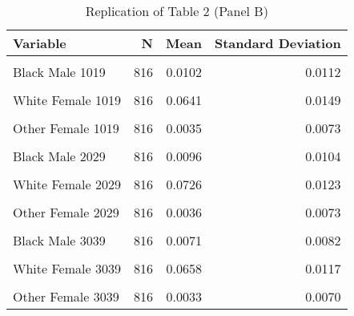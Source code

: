 \begin{table}[H]

\caption{\label{tab:tab:replicatetable2b}Replication of Table 2 (Panel B)}
\centering
\begin{tabular}[t]{lrrr}
\toprule
Variable & N & Mean & Standard Deviation\\
\midrule
\cellcolor{gray!6}{White Male 1019} & \cellcolor{gray!6}{816} & \cellcolor{gray!6}{0.0672} & \cellcolor{gray!6}{0.0151}\\
Black Male 1019 & 816 & 0.0102 & 0.0112\\
\cellcolor{gray!6}{Other Male 1019} & \cellcolor{gray!6}{816} & \cellcolor{gray!6}{0.0036} & \cellcolor{gray!6}{0.0076}\\
White Female 1019 & 816 & 0.0641 & 0.0149\\
\cellcolor{gray!6}{Black Female 1019} & \cellcolor{gray!6}{816} & \cellcolor{gray!6}{0.0101} & \cellcolor{gray!6}{0.0114}\\
\addlinespace
Other Female 1019 & 816 & 0.0035 & 0.0073\\
\cellcolor{gray!6}{White Male 2029} & \cellcolor{gray!6}{816} & \cellcolor{gray!6}{0.0741} & \cellcolor{gray!6}{0.0120}\\
Black Male 2029 & 816 & 0.0096 & 0.0104\\
\cellcolor{gray!6}{Other Male 2029} & \cellcolor{gray!6}{816} & \cellcolor{gray!6}{0.0035} & \cellcolor{gray!6}{0.0072}\\
White Female 2029 & 816 & 0.0726 & 0.0123\\
\addlinespace
\cellcolor{gray!6}{Black Female 2029} & \cellcolor{gray!6}{816} & \cellcolor{gray!6}{0.0104} & \cellcolor{gray!6}{0.0123}\\
Other Female 2029 & 816 & 0.0036 & 0.0073\\
\cellcolor{gray!6}{White Male 3039} & \cellcolor{gray!6}{816} & \cellcolor{gray!6}{0.0663} & \cellcolor{gray!6}{0.0118}\\
Black Male 3039 & 816 & 0.0071 & 0.0082\\
\cellcolor{gray!6}{Other Male 3039} & \cellcolor{gray!6}{816} & \cellcolor{gray!6}{0.0030} & \cellcolor{gray!6}{0.0066}\\
\addlinespace
White Female 3039 & 816 & 0.0658 & 0.0117\\
\cellcolor{gray!6}{Black Female 3039} & \cellcolor{gray!6}{816} & \cellcolor{gray!6}{0.0081} & \cellcolor{gray!6}{0.0098}\\
Other Female 3039 & 816 & 0.0033 & 0.0070\\

\end{tabular}
\end{table}
